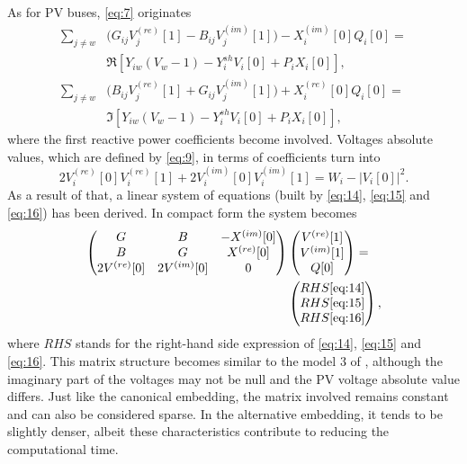 \documentclass[journal]{IEEEtran}
\begin{document}
As for PV buses, \eqref{eq:7} originates
\begin{equation}
  \begin{split}
    \sum_{j\neq w}&\biggl(G_{ij}V^{(re)}_j[1]-B_{ij}V^{(im)}_j[1]\biggr)-X^{(im)}_i[0]Q_i[0]=\\
    &\Re[Y_{iw}(V_w-1) - Y^{sh}_iV_i[0]+P_iX_i[0]],\\
    \sum_{j\neq w}&\biggl(B_{ij}V^{(re)}_j[1]+G_{ij}V^{(im)}_j[1]\biggr)+X^{(re)}_i[0]Q_i[0]=\\
    &\Im[Y_{iw}(V_w-1) - Y^{sh}_iV_i[0]+P_iX_i[0]],
  \end{split}
  \label{eq:15}
\end{equation}
where the first reactive power coefficients become involved. Voltages absolute values, which are defined by \eqref{eq:9}, in terms of coefficients turn into
\begin{equation}
  2V^{(re)}_i[0]V^{(re)}_i[1]+2V^{(im)}_i[0]V^{(im)}_i[1]=W_i-|V_i[0]|^2.
  \label{eq:16}
\end{equation}
As a result of that, a linear system of equations (built by \eqref{eq:14}, \eqref{eq:15} and \eqref{eq:16}) has been derived. In compact form the system becomes
\begin{equation}
  \begin{split}
\begin{pmatrix}
    G & B & -X^{(im)}[0]\\
    B & G & X^{(re)}[0]\\
    2V^{(re)}[0] & 2V^{(im)}[0] & 0\\
  \end{pmatrix}&
  \begin{pmatrix}
    V^{(re)}[1]\\
    V^{(im)}[1]\\
    Q[0]
  \end{pmatrix}
  =\\
  &\begin{pmatrix}
    RHS\text{\eqref{eq:14}}\\
    RHS\text{\eqref{eq:15}}\\
    RHS\text{\eqref{eq:16}}
  \end{pmatrix},
\end{split}
  \label{eq:17}
\end{equation}
where $RHS$ stands for the right-hand side expression of \eqref{eq:14}, \eqref{eq:15} and \eqref{eq:16}. This matrix structure becomes similar to the model 3 of \cite{wallace}, although the imaginary part of the voltages may not be null and the PV voltage absolute value differs. Just like the canonical embedding, the matrix involved remains constant and can also be considered sparse. In the alternative embedding, it tends to be slightly denser, albeit these characteristics contribute to reducing the computational time.
\end{document}
